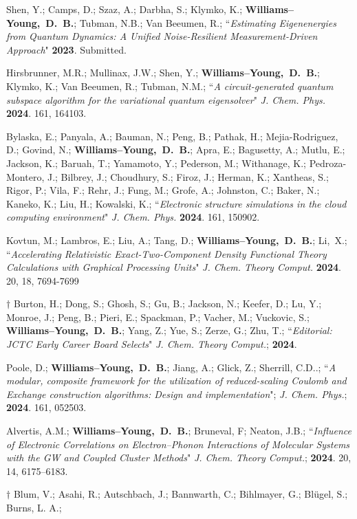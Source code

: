 \documentclass[10pt]{res} %
\newcommand*\me[0]{{\bf Williams--Young,~D.~B.}}
\newcommand*\xsli[0]{Li,~X.}
\begin{document}
\begin{resume}
\begin{etaremune}
  \item Shen, Y.; Camps, D.; Szaz, A.; Darbha, S.; Klymko, K.; \me; Tubman, N.B.; Van Beeumen, R.;
        ``\emph{Estimating Eigenenergies from Quantum Dynamics: A Unified Noise-Resilient Measurement-Driven Approach}"
        \textbf{2023}. Submitted.
  \item Hirsbrunner, M.R.; Mullinax, J.W.; Shen, Y.; \me; Klymko, K.; Van Beeumen, R.; Tubman, N.M.;
        ``\emph{A circuit-generated quantum subspace algorithm for the variational quantum eigensolver}"
       \emph{J. Chem. Phys.} \textbf{2024}. 161, 164103.
  \item Bylaska, E.; Panyala, A.; Bauman, N.; Peng, B.; Pathak, H.; Mejia-Rodriguez, D.; Govind, N.; \me; Apra, E.; 
        Bagusetty, A.; Mutlu, E.; Jackson, K.; Baruah, T.; Yamamoto, Y.; Pederson, M.; Withanage, K.; Pedroza-Montero, J.; 
        Bilbrey, J.; Choudhury, S.; Firoz, J.; Herman, K.; Xantheas, S.; Rigor, P.; Vila, F.; Rehr, J.; Fung, M.; Grofe, A.; 
        Johnston, C.; Baker, N.; Kaneko, K.; Liu, H.; Kowalski, K.;
        ``\emph{Electronic structure simulations in the cloud computing environment}"
        \emph{J. Chem. Phys.} \textbf{2024}. 161, 150902.
  \item Kovtun, M.; Lambros, E.; Liu, A.; Tang, D.; \me; \xsli;
        ``\emph{Accelerating Relativistic Exact-Two-Component Density Functional Theory Calculations with Graphical Processing Units}"
        \emph{J. Chem. Theory Comput.} \textbf{2024}. 20, 18, 7694-7699
  \item $\dagger$ Burton, H.; Dong, S.; Ghosh, S.; Gu, B.; Jackson, N.; Keefer, D.; Lu, Y.; Monroe, J.; Peng, B.; Pieri, E.; 
        Spackman, P.; Vacher, M.; Vuckovic, S.; \me; Yang, Z.; Yue, S.; Zerze, G.; Zhu, T.;
        ``\emph{Editorial: JCTC Early Career Board Selects}"
        \emph{J. Chem. Theory Comput.}; \textbf{2024}. 
  \item Poole, D.; \me; Jiang, A.; Glick, Z.; Sherrill, C.D..;
        ``\emph{A modular, composite framework for the utilization of reduced-scaling Coulomb and Exchange construction algorithms: Design and implementation}";
        \emph{J. Chem. Phys.}; \textbf{2024}. 161, 052503.
  \item Alvertis, A.M.; \me; Bruneval, F; Neaton, J.B.;
       ``\emph{Influence of Electronic Correlations on Electron–Phonon Interactions of Molecular Systems with the GW and Coupled Cluster Methods}"
       \emph{J. Chem. Theory Comput.}; \textbf{2024}. 20, 14, 6175–6183. 
  \item $\dagger$ Blum, V.; Asahi, R.; Autschbach, J.; Bannwarth, C.; Bihlmayer, G.; Blügel, S.; Burns, L. A.; 

\end{etaremune}
\end{resume}
\end{document}
